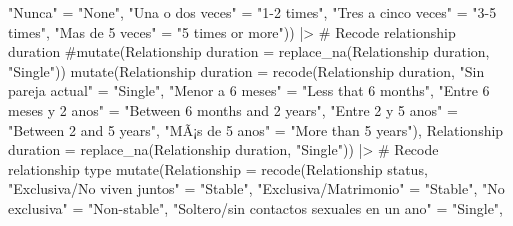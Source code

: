 \documentclass[
  bookmarksnumbered]{article}
\newenvironment{Shaded}{\begin{snugshade}}{\end{snugshade}}
\newcommand{\AttributeTok}[1]{\textcolor[rgb]{0.80,0.80,0.80}{#1}}
\newcommand{\CommentTok}[1]{\textcolor[rgb]{0.50,0.62,0.50}{#1}}
\newcommand{\FunctionTok}[1]{\textcolor[rgb]{0.94,0.94,0.56}{#1}}
\newcommand{\NormalTok}[1]{\textcolor[rgb]{0.80,0.80,0.80}{#1}}
\newcommand{\OtherTok}[1]{\textcolor[rgb]{0.94,0.94,0.56}{#1}}
\newcommand{\SpecialCharTok}[1]{\textcolor[rgb]{0.86,0.64,0.64}{#1}}
\newcommand{\StringTok}[1]{\textcolor[rgb]{0.80,0.58,0.58}{#1}}
\begin{document}
\begin{Shaded}
\begin{Highlighting}[]
                                                    \StringTok{"Nunca"} \OtherTok{=} \StringTok{"None"}\NormalTok{,}
                                                    \StringTok{"Una o dos veces"} \OtherTok{=} \StringTok{"1{-}2 times"}\NormalTok{,}
                                                    \StringTok{"Tres a cinco veces"} \OtherTok{=} \StringTok{"3{-}5 times"}\NormalTok{,}
                                                    \StringTok{"Mas de 5 veces"} \OtherTok{=} \StringTok{"5 times or more"}\NormalTok{)) }\SpecialCharTok{|\textgreater{}} 
  \CommentTok{\# Recode relationship duration}
  \CommentTok{\#mutate(\textasciigrave{}Relationship duration\textasciigrave{} = replace\_na(\textasciigrave{}Relationship duration\textasciigrave{}, "Single"))}
  \FunctionTok{mutate}\NormalTok{(}\StringTok{\textasciigrave{}}\AttributeTok{Relationship duration}\StringTok{\textasciigrave{}} \OtherTok{=} \FunctionTok{recode}\NormalTok{(}\StringTok{\textasciigrave{}}\AttributeTok{Relationship duration}\StringTok{\textasciigrave{}}\NormalTok{,}
                               \StringTok{"Sin pareja actual"}  \OtherTok{=} \StringTok{"Single"}\NormalTok{,}
                               \StringTok{"Menor a 6 meses"} \OtherTok{=} \StringTok{"Less that 6 months"}\NormalTok{,}
                               \StringTok{"Entre 6 meses y 2 anos"} \OtherTok{=} \StringTok{"Between 6 months and 2 years"}\NormalTok{,}
                               \StringTok{"Entre 2 y 5 anos"} \OtherTok{=} \StringTok{"Between 2 and 5 years"}\NormalTok{,}
                               \StringTok{"MÃ¡s de 5 anos"} \OtherTok{=} \StringTok{"More than 5 years"}\NormalTok{),}
         \StringTok{\textasciigrave{}}\AttributeTok{Relationship duration}\StringTok{\textasciigrave{}} \OtherTok{=} \FunctionTok{replace\_na}\NormalTok{(}\StringTok{\textasciigrave{}}\AttributeTok{Relationship duration}\StringTok{\textasciigrave{}}\NormalTok{, }\StringTok{"Single"}\NormalTok{)) }\SpecialCharTok{|\textgreater{}}
  \CommentTok{\# Recode relationship type}
  \FunctionTok{mutate}\NormalTok{(}\AttributeTok{Relationship =} \FunctionTok{recode}\NormalTok{(}\StringTok{\textasciigrave{}}\AttributeTok{Relationship status}\StringTok{\textasciigrave{}}\NormalTok{,}
                               \StringTok{"Exclusiva/No viven juntos"} \OtherTok{=} \StringTok{"Stable"}\NormalTok{,}
                               \StringTok{"Exclusiva/Matrimonio"} \OtherTok{=} \StringTok{"Stable"}\NormalTok{,}
                               \StringTok{"No exclusiva"} \OtherTok{=} \StringTok{"Non{-}stable"}\NormalTok{,}
                               \StringTok{"Soltero/sin contactos sexuales en un ano"} \OtherTok{=} \StringTok{"Single"}\NormalTok{,}

\end{Highlighting}
\end{Shaded}
\end{document}
